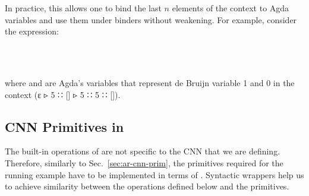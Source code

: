 In practice, this allows one to bind the last $n$ elements of the
context to Agda variables and use them under binders without weakening.
For example, consider the expression:
\begin{code}%
%
\>[2]\AgdaFunction{\AgdaUnderscore{}}\AgdaSpace{}%
\AgdaSymbol{:}\AgdaSpace{}%
\AgdaSpace{}%
\AgdaSymbol{\AgdaUnderscore{}}\AgdaSpace{}%
\AgdaSymbol{\AgdaUnderscore{}}\<%
\\
%
\>[2]\AgdaSymbol{\AgdaUnderscore{}}\AgdaSpace{}%
\AgdaSymbol{=}%
\>[2003I]\AgdaSpace{}%
\AgdaSymbol{(}\AgdaSpace{}%
\AgdaSymbol{(}\AgdaSpace{}%
\AgdaSymbol{)}\AgdaSpace{}%
\AgdaSpace{}%
\AgdaSpace{}%
\AgdaSymbol{(}\AgdaSpace{}%
\AgdaSpace{}%
\AgdaSpace{}%
\AgdaSpace{}%
\AgdaInductiveConstructor{[]}\AgdaSymbol{)}\AgdaSpace{}%
\AgdaSpace{}%
\AgdaInductiveConstructor{[]}\AgdaSymbol{)}\AgdaSpace{}%
\AgdaSymbol{(}\AgdaSpace{}%
\AgdaInductiveConstructor{[]}\AgdaSymbol{)}\AgdaSpace{}%
\<%
\\
\>[.][@{}l@{}]\<[2003I]%
\>[6]\AgdaSpace{}%
\AgdaSpace{}%
\AgdaSpace{}%
\AgdaSpace{}%
\AgdaSpace{}%
\AgdaSpace{}%
\AgdaSpace{}%
\AgdaSpace{}%
\AgdaSpace{}%
\AgdaSpace{}%
\AgdaSpace{}%
\AgdaSpace{}%
\AgdaSpace{}%
\AgdaSymbol{(}\AgdaSpace{}%
\AgdaSpace{}%
\AgdaSymbol{)}\AgdaSpace{}%
\<%
\end{code}
where  and  are Agda's variables that represent
de Bruijn variable 1 and 0{} in the context (ε ▹ 5 ∷ [] ▹ 5 ∷ 5 ∷ []).



\subsection{CNN Primitives in }
The built-in operations of  are not specific to the CNN that we
are defining.  Therefore, similarly to Sec.~\ref{sec:ar-cnn-prim},
the primitives required for the running example have to be
implemented in terms of .  Syntactic wrappers help us
to achieve similarity between the operations defined below and the
 primitives.

